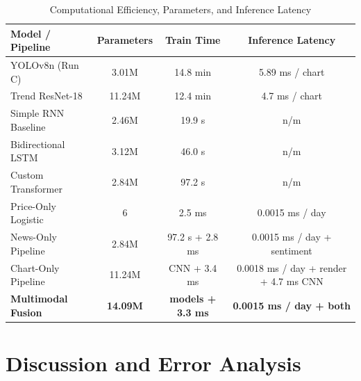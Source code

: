 \documentclass[10pt,journal]{IEEEtran}
\begin{document}
\begin{table}[htbp]
\centering
\caption{Computational Efficiency, Parameters, and Inference Latency}
\label{tab:efficiency}
\begin{tabular}{lccc}
\toprule
\textbf{Model / Pipeline} & \textbf{Parameters} & \textbf{Train Time} & \textbf{Inference Latency} \\
\midrule
YOLOv8n (Run C)         & 3.01M  & 14.8 min  & 5.89 ms / chart \\
Trend ResNet-18         & 11.24M & 12.4 min  & 4.7 ms / chart \\
Simple RNN Baseline     & 2.46M  & 19.9 s    & n/m \\
Bidirectional LSTM      & 3.12M  & 46.0 s    & n/m \\
Custom Transformer      & 2.84M  & 97.2 s    & n/m \\
Price-Only Logistic     & 6      & 2.5 ms    & 0.0015 ms / day \\
News-Only Pipeline      & 2.84M  & 97.2 s + 2.8 ms & 0.0015 ms / day + sentiment \\
Chart-Only Pipeline     & 11.24M & CNN + 3.4 ms & 0.0018 ms / day + render + 4.7 ms CNN \\
\textbf{Multimodal Fusion} & \textbf{14.09M} & \textbf{models + 3.3 ms} & \textbf{0.0015 ms / day + both} \\
\bottomrule
\end{tabular}
\end{table}

\section{Discussion and Error Analysis}
\label{sec:discussion}
\end{document}
